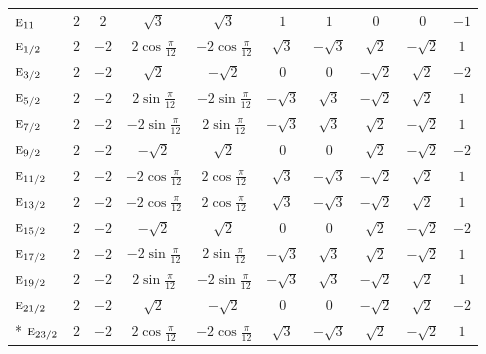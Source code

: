 \documentclass[10pt,a4paper]{article}
\makeatletter
\def\grouprule#1#2{\noalign{\marks\LTgroupmarks{\the\belowrulesep}\nobreak\vskip#1%
  \vskip\aboverulesep}\multispan\LT@cols\unskip{\leaders\hrule\@height#2\hfill\kern\z@}\cr
  \noalign{\penalty\LTrulebreak\vskip\belowrulesep\global\@lastruleclass\z@}}
\numberwithin{equation}{section}
\newcommand{\irr}[1]{\text{\normalfont\scshape #1}}
\makeatother
\begin{document}
{{\begin{longtable}{@{}lccccccccc@{}}
$\irr{e}_{11}$ & $2$ & $2$ & $\sqrt{3}$ & $\sqrt{3}$ & $1$ & $1$ & $0$ & $0$ & $-1$\\
\grouprule{0pt}{\lightrulewidth}
$\irr{e}_{1/2}$ & $2$ & $-2$ & $2\cos\tfrac{\pi}{12}$ & $-2\cos\tfrac{\pi}{12}$ & $\sqrt{3}$ & $-\sqrt{3}$ & $\sqrt{2}$ & $-\sqrt{2}$ & $1$\\
$\irr{e}_{3/2}$ & $2$ & $-2$ & $\sqrt{2}$ & $-\sqrt{2}$ & $0$ & $0$ & $-\sqrt{2}$ & $\sqrt{2}$ & $-2$\\
$\irr{e}_{5/2}$ & $2$ & $-2$ & $2\sin\tfrac{\pi}{12}$ & $-2\sin\tfrac{\pi}{12}$ & $-\sqrt{3}$ & $\sqrt{3}$ & $-\sqrt{2}$ & $\sqrt{2}$ & $1$\\
$\irr{e}_{7/2}$ & $2$ & $-2$ & $-2\sin\tfrac{\pi}{12}$ & $2\sin\tfrac{\pi}{12}$ & $-\sqrt{3}$ & $\sqrt{3}$ & $\sqrt{2}$ & $-\sqrt{2}$ & $1$\\
$\irr{e}_{9/2}$ & $2$ & $-2$ & $-\sqrt{2}$ & $\sqrt{2}$ & $0$ & $0$ & $\sqrt{2}$ & $-\sqrt{2}$ & $-2$\\
$\irr{e}_{11/2}$ & $2$ & $-2$ & $-2\cos\tfrac{\pi}{12}$ & $2\cos\tfrac{\pi}{12}$ & $\sqrt{3}$ & $-\sqrt{3}$ & $-\sqrt{2}$ & $\sqrt{2}$ & $1$\\
$\irr{e}_{13/2}$ & $2$ & $-2$ & $-2\cos\tfrac{\pi}{12}$ & $2\cos\tfrac{\pi}{12}$ & $\sqrt{3}$ & $-\sqrt{3}$ & $-\sqrt{2}$ & $\sqrt{2}$ & $1$\\
$\irr{e}_{15/2}$ & $2$ & $-2$ & $-\sqrt{2}$ & $\sqrt{2}$ & $0$ & $0$ & $\sqrt{2}$ & $-\sqrt{2}$ & $-2$\\
$\irr{e}_{17/2}$ & $2$ & $-2$ & $-2\sin\tfrac{\pi}{12}$ & $2\sin\tfrac{\pi}{12}$ & $-\sqrt{3}$ & $\sqrt{3}$ & $\sqrt{2}$ & $-\sqrt{2}$ & $1$\\
$\irr{e}_{19/2}$ & $2$ & $-2$ & $2\sin\tfrac{\pi}{12}$ & $-2\sin\tfrac{\pi}{12}$ & $-\sqrt{3}$ & $\sqrt{3}$ & $-\sqrt{2}$ & $\sqrt{2}$ & $1$\\
$\irr{e}_{21/2}$ & $2$ & $-2$ & $\sqrt{2}$ & $-\sqrt{2}$ & $0$ & $0$ & $-\sqrt{2}$ & $\sqrt{2}$ & $-2$\\*
$\irr{e}_{23/2}$ & $2$ & $-2$ & $2\cos\tfrac{\pi}{12}$ & $-2\cos\tfrac{\pi}{12}$ & $\sqrt{3}$ & $-\sqrt{3}$ & $\sqrt{2}$ & $-\sqrt{2}$ & $1$\\
\bottomrule\end{longtable}}}
\end{document}

